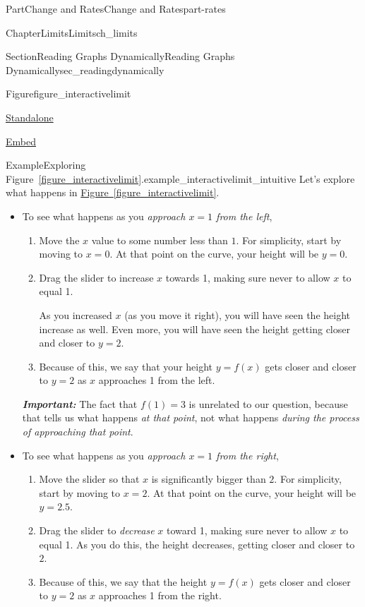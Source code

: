 \documentclass[oneside,10pt,]{tufte-book}
\newcommand{\xreffont}{\relax}
\newcommand{\alert}[1]{\textbf{\textit{#1}}}
\numberwithin{equation}{chapter}
\begin{document}
\begin{partptx}{Part}{Change and Rates}{}{Change and Rates}{}{}{part-rates}
\begin{chapterptx}{Chapter}{Limits}{}{Limits}{}{}{ch_limits}
\begin{sectionptx}{Section}{Reading Graphs Dynamically}{}{Reading Graphs Dynamically}{}{}{sec_readingdynamically}
\begin{figureptx}{Figure}{}{figure_interactivelimit}{}
\begin{sidebyside}{2}{0.075}{0.075}{0.17}
\begin{sbspanel}{0.21}
\href{http://webwork.bridgew.edu/oer/functions_at_work/figure_interactivelimit-2.html}{Standalone}%
\par
\href{http://webwork.bridgew.edu/oer/functions_at_work/figure_interactivelimit-2-if.html}{Embed}%
\end{sbspanel}%
\end{sidebyside}%
\tcblower
\end{figureptx}%
\begin{example}{Example}{Exploring Figure~{\xreffont\ref*{figure_interactivelimit}}.}{example_interactivelimit_intuitive}%
Let's explore what happens in  \hyperref[figure_interactivelimit]{Figure~{\xreffont\ref{figure_interactivelimit}}}.%
%
\begin{itemize}[label=\textbullet]
\item{}To see what happens as you \emph{approach \(x=1\) from the left},%
\begin{enumerate}
\item{}Move the \(x\) value to some number less than \(1\). For simplicity, start by moving to \(x=0\). At that point on the curve, your height will be \(y=0\).%
\item{}Drag the slider to increase \(x\) towards 1, making sure never to allow \(x\) to equal 1.%
\par
As you increased \(x\) (as you move it right), you will have seen the height increase as well.  Even more, you will have seen the height getting closer and closer to \(y=2\).%
\item{}Because of this, we say that your height \(y=f(x)\) gets closer and closer to \(y=2\) as \(x\) approaches 1 from the left.%
\end{enumerate}
%
\par
\alert{Important:} The fact that \(f(1)=3\) is unrelated to our question, because that tells us what happens \emph{at that point}, not what happens \emph{during the process of approaching that point}.%
\item{}To see what happens as you \emph{approach \(x=1\) from the right},%
\begin{enumerate}
\item{}Move the slider so that \(x\) is significantly bigger than \(2\). For simplicity, start by moving to \(x=2\). At that point on the curve, your height will be \(y=2.5\).%
\item{}Drag the slider to \emph{decrease} \(x\) toward 1, making sure never to allow \(x\) to equal 1. As you do this, the height decreases, getting closer and closer to \(2\).%
\item{}Because of this, we say that the height \(y=f(x)\) gets closer and closer to \(y=2\) as \(x\) approaches 1 from the right.%

\end{enumerate}
\end{itemize}
\end{example}
\end{sectionptx}
\end{chapterptx}
\end{partptx}
\end{document}
